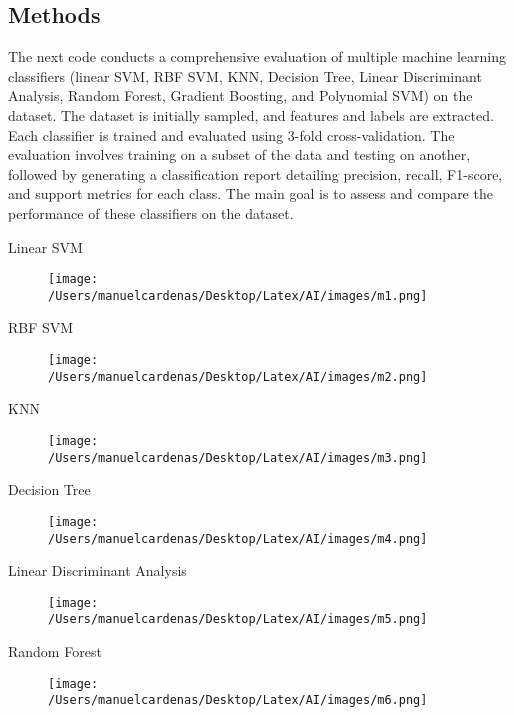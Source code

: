 \documentclass{article}
\begin{document}
    \subsection{Methods}

    The next code conducts a comprehensive evaluation of multiple machine learning classifiers 
    (linear SVM, RBF SVM, KNN, Decision Tree, Linear Discriminant Analysis, Random Forest, Gradient Boosting, and Polynomial SVM) 
    on the dataset. The dataset is initially sampled, and features and labels are extracted. Each classifier is trained and evaluated 
    using 3-fold cross-validation. The evaluation involves training on a subset of the data and testing on another, followed by 
    generating a classification report detailing precision, recall, F1-score, and support metrics for each class. The main goal is 
    to assess and compare the performance of these classifiers on the dataset.\pagebreak

    Linear SVM
    \begin{figure}[h]
        \centering
        \texttt{[image: /Users/manuelcardenas/Desktop/Latex/AI/images/m1.png]}
        \label{fig:m1}
    \end{figure}

    RBF SVM \pagebreak
    \begin{figure}[h]
        \centering
        \texttt{[image: /Users/manuelcardenas/Desktop/Latex/AI/images/m2.png]}
        \label{fig:m2}
    \end{figure}

    KNN
    \begin{figure}[h]
        \centering
        \texttt{[image: /Users/manuelcardenas/Desktop/Latex/AI/images/m3.png]}
        \label{fig:m3}
    \end{figure}

    Decision Tree\pagebreak
    \begin{figure}[h]
        \centering
        \texttt{[image: /Users/manuelcardenas/Desktop/Latex/AI/images/m4.png]}
        \label{fig:m4}
    \end{figure}

    Linear Discriminant Analysis
    \begin{figure}[h]
        \centering
        \texttt{[image: /Users/manuelcardenas/Desktop/Latex/AI/images/m5.png]}
        \label{fig:m5}
    \end{figure}

    Random Forest\pagebreak
    \begin{figure}[h]
        \centering
        \texttt{[image: /Users/manuelcardenas/Desktop/Latex/AI/images/m6.png]}
        \label{fig:m6}
    \end{figure}
\end{document}
